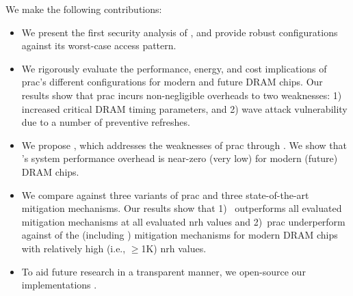 We make the following contributions:
\begin{itemize}
    [noitemsep,topsep=0pt,parsep=0pt,partopsep=0pt,labelindent=0pt,itemindent=0pt,leftmargin=*]
    \item We present the first security analysis of , and provide robust configurations against its worst-case access pattern.
    \item We rigorously evaluate the performance, energy, and cost implications of \gls{prac}'s different configurations for modern and future DRAM chips. Our results show that \gls{prac} incurs non-negligible overheads  to two  weaknesses: 1) increased critical DRAM timing parameters, and 2) wave attack vulnerability due to  a  number of preventive refreshes.
    \item We propose \X{}, which addresses the weaknesses of \gls{prac} through . We show that \X{}'s system performance overhead is near-zero (very low) for modern (future) DRAM chips.
    \item We compare \X{} against three variants of \gls{prac} and three state-of-the-art mitigation mechanisms. Our results show that 1)~\X{} outperforms all evaluated mitigation mechanisms at all evaluated \gls{nrh} values and 2)~\gls{prac}  underperform against  of the  (including \X{}) mitigation mechanisms for modern DRAM chips with relatively high (i.e., $\geq$1K) \gls{nrh} values.
    \item To aid future research in a transparent manner, we open-source our implementations .
\end{itemize}


